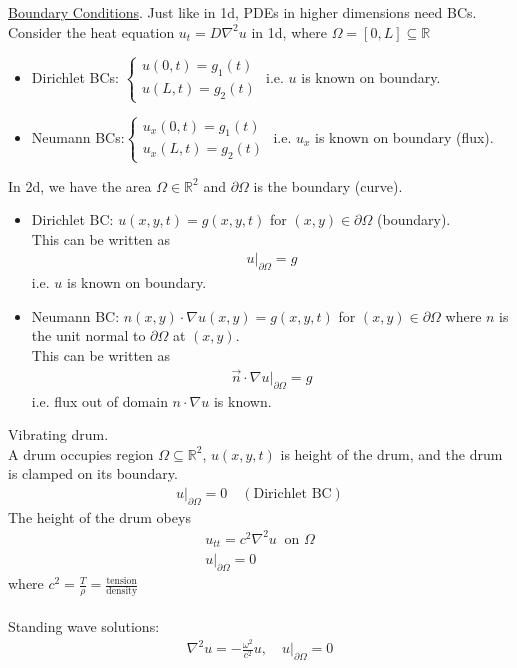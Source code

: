 \documentclass[12pt, letterpaper]{article}
\begin{document}
\underline{Boundary Conditions}. Just like in 1d, PDEs in higher dimensions need BCs. \\
Consider the heat equation $u_t = D \nabla^2 u$ in 1d, where $\Omega = [0,L] \subseteq \mathbb{R}$
\begin{itemize}
    \item Dirichlet BCs: $\begin{cases}
        u(0,t) = g_1(t) \\
        u(L,t) = g_2(t)
    \end{cases}$ i.e. $u$ is known on boundary.
    \item Neumann BCs:$\begin{cases}
        u_x(0,t) = g_1(t) \\
        u_x(L,t) = g_2(t)
    \end{cases}$ i.e. $u_x$ is known on boundary (flux).
\end{itemize}
In 2d, we have the area $\Omega \in \mathbb{R}^2$ and $\partial \Omega$ is the boundary (curve).
\begin{itemize}
    \item Dirichlet BC: $u(x,y,t) = g(x,y,t)$ for $(x,y) \in \partial \Omega$ (boundary). \\
    This can be written as 
    \begin{align*}
        u\big|_{\partial \Omega} = g
    \end{align*}
    i.e. $u$ is known on boundary.
    \item Neumann BC: $n(x,y) \cdot \nabla u(x,y) = g(x,y,t)$ for $(x,y) \in \partial \Omega$ 
    where $n$ is the unit normal to $\partial \Omega$ at $(x,y)$. \\
    This can be written as
    \begin{align*}
        \vec n \cdot \nabla u \big|_{\partial \Omega} = g
    \end{align*}
    i.e. flux out of domain $n\cdot \nabla u$ is known.
\end{itemize}
 Vibrating drum. \\ 
A drum occupies region $\Omega \subseteq \mathbb{R}^2$, $u(x,y,t)$ is height of the drum, and 
the drum is clamped on its boundary.
\begin{align*}
    u\big|_{\partial \Omega} = 0 \quad (\text{Dirichlet BC})
\end{align*}
The height of the drum obeys 
\begin{align*}
    u_{tt} = c^2 \nabla^2 u\ \text{ on } \Omega \\
    u\big|_{\partial \Omega} = 0 
\end{align*}
where $c^2 = \frac{T}{\rho} = \frac{\text{tension}}{\text{density}}$ \\ \\ 
Standing wave solutions:
\begin{align*}
    \nabla^2 u = -\frac{\omega^2}{c^2}u,\quad u\big|_{\partial \Omega} = 0
\end{align*}
\end{document}
